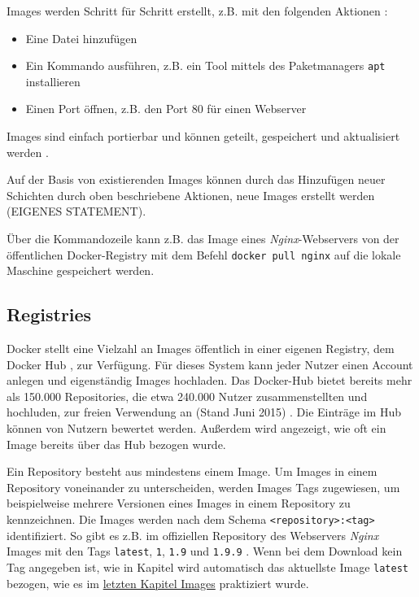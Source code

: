 \documentclass[11pt,a4paper,oneside]{report}
\begin{document}
      Images werden Schritt für Schritt erstellt, z.B. mit den folgenden Aktionen \cite[S.11]{dockerBook}:
      \begin{itemize}
        \item Eine Datei hinzufügen
        \item Ein Kommando ausführen, z.B. ein Tool mittels des Paketmanagers \texttt{apt} installieren
        \item Einen Port öffnen, z.B. den Port 80 für einen Webserver
      \end{itemize}

      Images sind einfach portierbar und können geteilt, gespeichert und aktualisiert werden \cite[S.11]{dockerBook}.

      Auf der Basis von existierenden Images können durch das Hinzufügen neuer Schichten durch oben beschriebene Aktionen, neue Images erstellt werden (EIGENES STATEMENT).

      Über die Kommandozeile kann z.B. das Image eines \emph{Nginx}-Webservers von der öffentlichen Docker-Registry mit dem Befehl \texttt{docker pull nginx} auf die lokale Maschine gespeichert werden.


    \subsection{Registries}
      Docker stellt eine Vielzahl an Images öffentlich in einer eigenen Registry, dem Docker Hub \cite[S.11]{dockerBook}, zur Verfügung. Für dieses System kann jeder Nutzer einen Account anlegen und eigenständig Images hochladen. Das Docker-Hub bietet bereits mehr als 150.000 Repositories, die etwa 240.000 Nutzer zusammenstellten und hochluden, zur freien Verwendung an (Stand Juni 2015) \cite[S.16]{slideshareDockercon15}. Die Einträge im Hub können von Nutzern bewertet werden. Außerdem wird angezeigt, wie oft ein Image bereits über das Hub bezogen wurde.

      Ein Repository besteht aus mindestens einem Image. Um Images in einem Repository voneinander zu unterscheiden, werden Images Tags zugewiesen, um beispielweise mehrere Versionen eines Images in einem Repository zu kennzeichnen. Die Images werden nach dem Schema \texttt{<repository>:<tag>} identifiziert. So gibt es z.B. im offiziellen Repository des Webservers \emph{Nginx} Images mit den Tags \texttt{latest}, \texttt{1}, \texttt{1.9} und \texttt{1.9.9} \cite{dockerhubNginx}. Wenn bei dem Download kein Tag angegeben ist, wie in Kapitel wird automatisch das aktuellste Image \texttt{latest} bezogen, wie es im \hyperref[dockerImages]{letzten Kapitel \glqq{}Images\grqq{}} praktiziert wurde.
\end{document}
